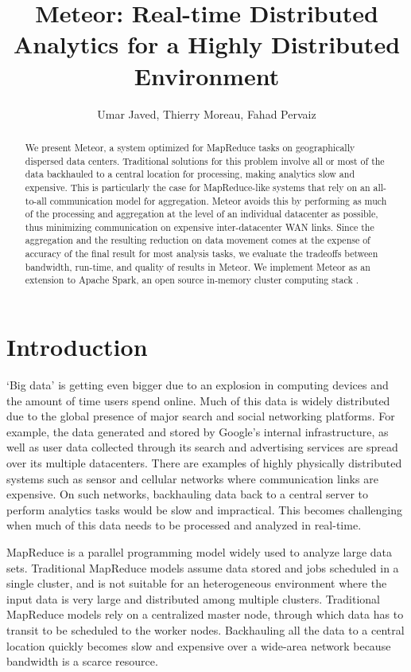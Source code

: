\documentclass{article}
\begin{document}
\title{Meteor: Real-time Distributed Analytics for a Highly Distributed Environment
}
\author{Umar Javed, Thierry Moreau, Fahad Pervaiz}

\maketitle

\begin{abstract}
We present Meteor, a system optimized for MapReduce tasks on geographically dispersed 
data centers. Traditional solutions for this problem involve all or most of the data backhauled to a central location for processing, making analytics slow and expensive. This is particularly the case for MapReduce-like systems that rely on an all-to-all communication model for aggregation. Meteor avoids this by performing as much of the processing and aggregation at the level of an individual datacenter as possible, thus minimizing communication on expensive inter-datacenter WAN links. Since the aggregation and the resulting reduction on data movement comes at the expense of accuracy of the final result for most analysis tasks, we evaluate the tradeoffs between bandwidth, run-time, and quality of results in Meteor. We implement Meteor as an extension to Apache Spark, an open source in-memory cluster computing stack \cite{1}. 
\end{abstract}

\section{Introduction}

‘Big data’ is getting even bigger due to an explosion in computing devices and the amount of time users spend online. Much of this data is widely distributed due to the global presence of major search and social networking platforms. For example, the data generated and stored by Google’s internal infrastructure, as well as user data collected through its search and advertising services are spread over its multiple datacenters. There are examples of highly physically distributed systems such as sensor and cellular networks where communication links are expensive. On such networks,  backhauling data back to a central server to perform analytics tasks would be slow and impractical. This becomes challenging when much of this data needs to be processed and analyzed in real-time.   

MapReduce is a parallel programming model widely used to analyze large data sets. Traditional MapReduce models assume data stored and jobs scheduled in a single cluster, and is not suitable for an heterogeneous environment where the input data is very large and distributed among multiple clusters. Traditional MapReduce models rely on a centralized master node, through which data has to transit to be scheduled to the worker nodes. Backhauling all the data to a central location quickly becomes slow and expensive over a wide-area network because bandwidth is a scarce resource.
\end{document}
